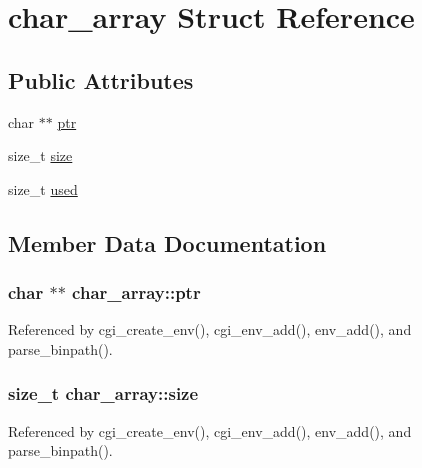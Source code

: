 \hypertarget{structchar__array}{\section{char\-\_\-array Struct Reference}
\label{structchar__array}
}
\subsection*{Public Attributes}
\begin{DoxyCompactItemize}
\item 
char $\ast$$\ast$ \hyperlink{structchar__array_a20165f0c17cd09201be1304263a7a930}{ptr}
\item 
size\-\_\-t \hyperlink{structchar__array_aa334dae0c399bb6319dff0c91579b895}{size}
\item 
size\-\_\-t \hyperlink{structchar__array_a06cada9acbeb475f05a75722ebca4608}{used}
\end{DoxyCompactItemize}


\subsection{Member Data Documentation}
\hypertarget{structchar__array_a20165f0c17cd09201be1304263a7a930}{
\subsubsection[{ptr}]{\setlength{\rightskip}{0pt plus 5cm}char $\ast$$\ast$ char\-\_\-array\-::ptr}}\label{structchar__array_a20165f0c17cd09201be1304263a7a930}


Referenced by cgi\-\_\-create\-\_\-env(), cgi\-\_\-env\-\_\-add(), env\-\_\-add(), and parse\-\_\-binpath().

\hypertarget{structchar__array_aa334dae0c399bb6319dff0c91579b895}{
\subsubsection[{size}]{\setlength{\rightskip}{0pt plus 5cm}size\-\_\-t char\-\_\-array\-::size}}\label{structchar__array_aa334dae0c399bb6319dff0c91579b895}


Referenced by cgi\-\_\-create\-\_\-env(), cgi\-\_\-env\-\_\-add(), env\-\_\-add(), and parse\-\_\-binpath().

